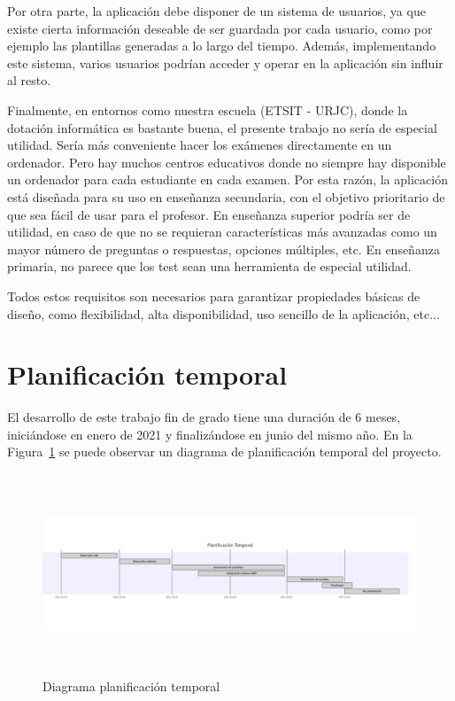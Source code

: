 \documentclass[a4paper, 12pt]{book}
\begin{document}
Por otra parte, la aplicación debe disponer de un sistema de usuarios, ya
que existe cierta información deseable de ser guardada por cada usuario,
como por ejemplo las plantillas generadas a lo largo del tiempo. Además,
implementando este sistema, varios usuarios podrían acceder y operar en
la aplicación sin influir al resto.



Finalmente, en entornos como nuestra escuela (ETSIT - URJC),
donde la dotación informática
es bastante buena, el presente trabajo no sería de especial utilidad.
Sería más conveniente hacer los exámenes directamente en un ordenador.
Pero hay muchos centros educativos donde no siempre hay disponible
un ordenador
para cada estudiante en cada examen. Por esta razón, la aplicación
está diseñada para su uso en enseñanza secundaria, con el objetivo
prioritario de que sea fácil de usar para el profesor.
En enseñanza superior podría ser de utilidad, en caso de que no se requieran
características más avanzadas como un mayor número de preguntas o respuestas,
opciones múltiples, etc.
En enseñanza primaria, no parece que los test sean una herramienta de especial utilidad.

Todos estos requisitos son necesarios para garantizar propiedades básicas
de diseño, como flexibilidad, alta disponibilidad, uso sencillo
de la aplicación, etc...


\section{Planificación temporal}
\label{sec:planificacion-temporal}

El desarrollo de este trabajo fin de grado tiene una duración de 6 meses,
iniciándose en enero de 2021 y finalizándose en junio del mismo año.
En la Figura~\ref{figura:planificacion} se puede observar
un diagrama de planificación temporal del proyecto.

\begin{figure}
  \centering
  \includegraphics[width=15cm, height=6cm]{img/planificacion}
  \caption{Diagrama planificación temporal}
  \label{figura:planificacion}
\end{figure}
\end{document}
